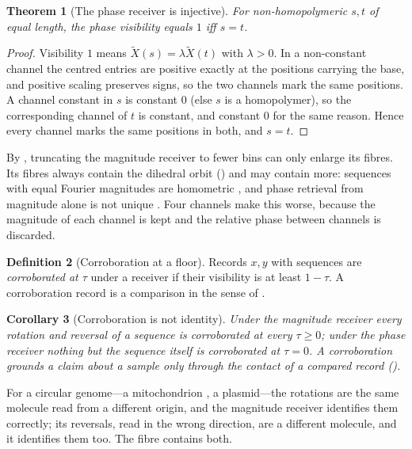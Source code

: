 \documentclass[11pt,twocolumn,a4paper]{article}
\theoremstyle{plain}
\newtheorem{theorem}{Theorem}[section]
\newtheorem{corollary}[theorem]{Corollary}
\theoremstyle{definition}
\newtheorem{definition}[theorem]{Definition}
\theoremstyle{remark}
\begin{document}
\begin{theorem}[The phase receiver is injective]
\label{thm:phase}
For non-homopolymeric $s,t$ of equal length, the phase visibility equals $1$ iff
$s=t$.
\end{theorem}

\begin{proof}
Visibility $1$ means $\tilde X(s)=\lambda\tilde X(t)$ with $\lambda>0$. In a
non-constant channel the centred entries are positive exactly at the positions
carrying the base, and positive scaling preserves signs, so the two channels mark
the same positions. A channel constant in $s$ is constant $0$ (else $s$ is a
homopolymer), so the corresponding channel of $t$ is constant, and constant
$0$ for the same reason. Hence every channel marks the same positions in both,
and $s=t$.
\end{proof}

By , truncating the magnitude receiver to fewer bins can only
enlarge its fibres. Its fibres always contain the dihedral orbit
() and may contain more: sequences with equal Fourier
magnitudes are homometric \citep{patterson1934,rosenblatt1982}, and phase
retrieval from magnitude alone is not unique \citep{hayes1980}. Four channels
make this worse, because the magnitude of each channel is kept and the
relative phase between channels is discarded.

\begin{definition}[Corroboration at a floor]
\label{def:corrob}
Records $x,y$ with sequences are \emph{corroborated at $\tau$} under a receiver
if their visibility is at least $1-\tau$. A corroboration record is a
comparison in the sense of .
\end{definition}

\begin{corollary}[Corroboration is not identity]
\label{cor:notidentity}
Under the magnitude receiver every rotation and reversal of a sequence is
corroborated at every $\tau\ge0$; under the phase receiver nothing but the
sequence itself is corroborated at $\tau=0$. A corroboration grounds a claim
about a sample only through the contact of a compared record
().
\end{corollary}

For a circular genome---a mitochondrion \citep{anderson1981}, a plasmid---the
rotations are the same molecule read from a different origin, and the magnitude
receiver identifies them correctly; its reversals, read in the wrong direction,
are a different molecule, and it identifies them too. The fibre contains both.
\end{document}
